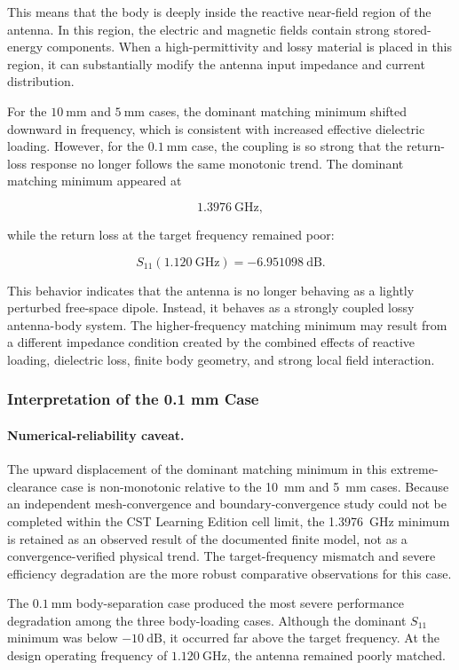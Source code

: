 This means that the body is deeply inside the reactive near-field region of the antenna. In this region, the electric and magnetic fields contain strong stored-energy components. When a high-permittivity and lossy material is placed in this region, it can substantially modify the antenna input impedance and current distribution.

For the \(10~\mathrm{mm}\) and \(5~\mathrm{mm}\) cases, the dominant matching minimum shifted downward in frequency, which is consistent with increased effective dielectric loading. However, for the \(0.1~\mathrm{mm}\) case, the coupling is so strong that the return-loss response no longer follows the same monotonic trend. The dominant matching minimum appeared at

\[
1.3976~\mathrm{GHz},
\]

while the return loss at the target frequency remained poor:

\[
S_{11}(1.120~\mathrm{GHz}) = -6.951098~\mathrm{dB}.
\]

This behavior indicates that the antenna is no longer behaving as a lightly perturbed free-space dipole. Instead, it behaves as a strongly coupled lossy antenna-body system. The higher-frequency matching minimum may result from a different impedance condition created by the combined effects of reactive loading, dielectric loss, finite body geometry, and strong local field interaction.

\subsubsection{Interpretation of the 0.1 mm Case}



\paragraph{Numerical-reliability caveat.}
The upward displacement of the dominant matching minimum in this extreme-clearance case is non-monotonic relative to the 10~mm and 5~mm cases. Because an independent mesh-convergence and boundary-convergence study could not be completed within the CST Learning Edition cell limit, the 1.3976~GHz minimum is retained as an observed result of the documented finite model, not as a convergence-verified physical trend. The target-frequency mismatch and severe efficiency degradation are the more robust comparative observations for this case.

The \(0.1~\mathrm{mm}\) body-separation case produced the most severe performance degradation among the three body-loading cases. Although the dominant \(S_{11}\) minimum was below \(-10~\mathrm{dB}\), it occurred far above the target frequency. At the design operating frequency of \(1.120~\mathrm{GHz}\), the antenna remained poorly matched.

